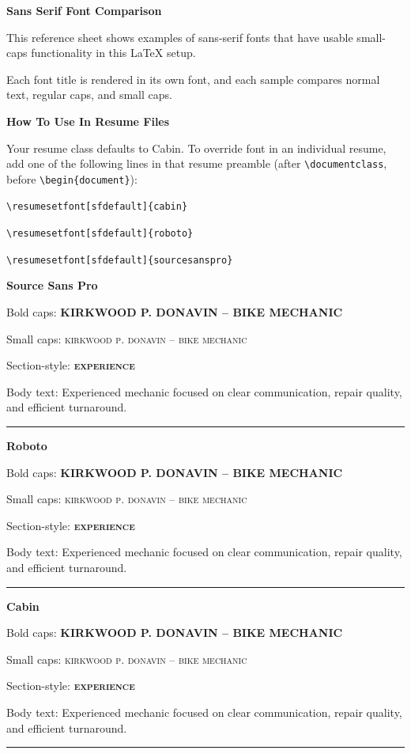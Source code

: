 \documentclass[11pt]{article}
\newcommand{\SampleNormalText}{Kirkwood P. Donavin -- Bike Mechanic}
\newcommand{\SampleBodyText}{Experienced mechanic focused on clear communication, repair quality, and efficient turnaround.}
\newcommand{\SampleSectionText}{Experience}
\newcommand{\SampleCapsText}{KIRKWOOD P. DONAVIN -- BIKE MECHANIC}
\newcommand{\FontBlock}[3]{%
  \begingroup
  #2
  {\Large\bfseries #1}\par
  \endgroup
  \begingroup
  #3
  {Bold caps: \bfseries \SampleCapsText\par}
  {Small caps: \scshape\MakeLowercase{\SampleNormalText}\par}
  {Section-style: \bfseries\scshape\MakeLowercase{\SampleSectionText}\par}
  Body text: \SampleBodyText\par
  \endgroup
  \vspace{0.85em}
  \textcolor{gray}{\rule{\linewidth}{0.4pt}}\par
}
\begin{document}
{\LARGE\bfseries Sans Serif Font Comparison}\par
This reference sheet shows examples of sans-serif fonts that have usable small-caps functionality in this LaTeX setup.\par
Each font title is rendered in its own font, and each sample compares normal text, regular caps, and small caps.\par

\vspace{0.6em}
{\large\bfseries How To Use In Resume Files}\par
Your resume class defaults to Cabin. To override font in an individual resume, add one of the following lines in that resume preamble (after \verb|\documentclass|, before \verb|\begin{document}|):\par
\verb|\resumesetfont[sfdefault]{cabin}|\par
\verb|\resumesetfont[sfdefault]{roboto}|\par
\verb|\resumesetfont[sfdefault]{sourcesanspro}|\par

\vspace{0.8em}

\FontBlock{Source Sans Pro}{\selectfont}{\fontfamily{SourceSansPro-LF}\selectfont}
\FontBlock{Roboto}{\roboto}{\roboto}
\FontBlock{Cabin}{\cabin}{\cabin}
\end{document}
